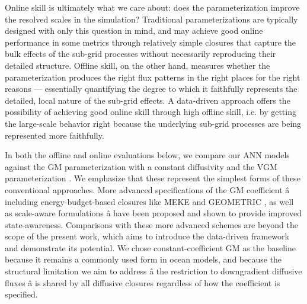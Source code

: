 \documentclass[draft]{agujournal2019}
\begin{document}
Online skill is ultimately what we care about: does the parameterization improve the resolved scales in the simulation? Traditional parameterizations are typically designed with only this question in mind, and may achieve good online performance in some metrics through relatively simple closures that capture the bulk effects of the sub-grid processes without necessarily reproducing their detailed structure. Offline skill, on the other hand, measures whether the parameterization produces the right flux patterns in the right places for the right reasons --- essentially quantifying the degree to which it faithfully represents the detailed, local nature of the sub-grid effects. 
A data-driven approach offers the possibility of achieving good 
online skill through high offline skill, i.e. by getting the 
large-scale behavior right because the underlying sub-grid processes are being represented more faithfully. 


In both the offline and online evaluations below, we compare our ANN models against the GM parameterization with a constant diffusivity and the VGM parameterization \cite{khani2023gradient}. We emphasize that these represent the simplest forms of these conventional approaches. More advanced specifications of the GM coefficient â including energy-budget-based closures like MEKE \cite{jansen2019toward} and GEOMETRIC \cite{mak2018implementation}, as well as scale-aware formulations \cite{mak2023scale} â have been proposed and shown to provide improved state-awareness. Comparisons with these more advanced schemes are beyond the scope of the present work, which aims to introduce the data-driven framework and demonstrate its potential. We chose constant-coefficient GM as the baseline because it remains a commonly  used form in ocean models, and because the structural limitation we aim to address â the restriction to downgradient diffusive fluxes â is shared by all diffusive closures regardless of how the coefficient is specified.
\end{document}
